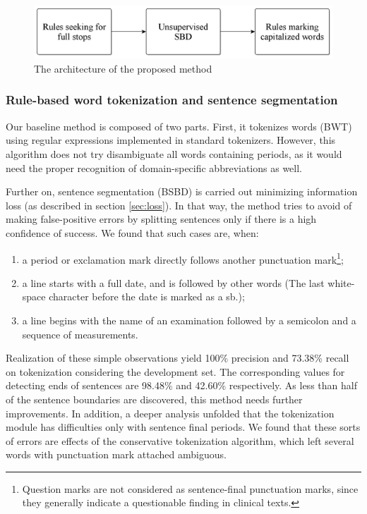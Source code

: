 \begin{figure}[H]
  \centering
  \includegraphics[scale=0.2]{Clinical/clin_segm_arch.png} 
  \caption{The architecture of the proposed method}
  \label{fig:clin-segment-arch}
\end{figure}

\subsubsection{Rule-based word tokenization and sentence segmentation}

Our baseline method is composed of two parts. 
First, it tokenizes words (BWT) using regular expressions implemented in standard tokenizers. %
However, this algorithm does not try disambiguate all words containing periods, as it would need the proper recognition of domain-specific abbreviations as well. %

Further on, sentence segmentation (BSBD) is carried out minimizing information loss (as described in section \ref{sec:loss}). 
In that way, the method tries to avoid of making false-positive errors by splitting sentences only if there is a high confidence of success. 
We found that such cases are, when:
\begin{enumerate} 
 \item a period or exclamation mark directly follows another punctuation mark\footnote{Question marks are not considered as sentence-final punctuation marks, since they generally indicate a questionable finding in clinical texts.};
 \item a line starts with a full date, and is followed by other words (The last white-space character before the date is marked as a \gls{sb}.);
 \item a line begins with the name of an examination followed by a semicolon and a sequence of measurements.
\end{enumerate}

Realization of these simple observations yield 100\% precision and 73.38\% recall on tokenization considering the development set. 
The corresponding values for detecting ends of sentences are 98.48\% and 42.60\% respectively. 
As less than half of the sentence boundaries are discovered, this method needs further improvements.
In addition, a deeper analysis unfolded that the tokenization module has difficulties only with sentence final periods. 
We found that these sorts of errors are effects of the conservative tokenization algorithm, which left several words with punctuation mark attached ambiguous.

